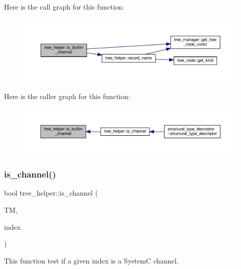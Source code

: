 Here is the call graph for this function\+:
\nopagebreak
\begin{figure}[H]
\begin{center}
\leavevmode
\includegraphics[width=350pt]{d7/d99/classtree__helper_af8cf910fccca7d978c710dc49c57ec1c_cgraph}
\end{center}
\end{figure}
Here is the caller graph for this function\+:
\nopagebreak
\begin{figure}[H]
\begin{center}
\leavevmode
\includegraphics[width=350pt]{d7/d99/classtree__helper_af8cf910fccca7d978c710dc49c57ec1c_icgraph}
\end{center}
\end{figure}
\mbox{\label{classtree__helper_af7d6783fd734a05edd5728b2a8e98b77}} 
\subsubsection{\texorpdfstring{is\+\_\+channel()}{is\_channel()}}
{\footnotesize\ttfamily bool tree\+\_\+helper\+::is\+\_\+channel (\begin{DoxyParamCaption}\item[{const \hyperlink{tree__manager_8hpp_a792e3f1f892d7d997a8d8a4a12e39346}{tree\+\_\+manager\+Const\+Ref} \&}]{TM,  }\item[{const unsigned int}]{index }\end{DoxyParamCaption})\hspace{0.3cm}{\ttfamily [static]}}



This function test if a given index is a SystemC channel. 


